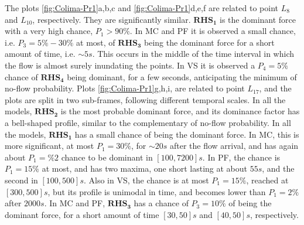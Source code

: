 \documentclass{article}
\begin{document}
The plots \ref{fig:Colima-Pr1}a,b,c and \ref{fig:Colima-Pr1}d,e,f are related to point $L_8$ and $L_{10}$, respectively. They are significantly similar. $\boldsymbol{RHS_1}$ is the dominant force with a very high chance, $P_1>90\%$. In MC and PF it is observed a small chance, i.e. $P_3=5\%-30\%$ at most, of $\boldsymbol{RHS_3}$ being the dominant force for a short amount of time, i.e. $\sim 5 s$. This occurs in the middle of the time interval in which the flow is almost surely inundating the points. In VS it is observed a $P_4=5\%$ chance of $\boldsymbol{RHS_4}$ being dominant, for a few seconds, anticipating the minimum of no-flow probability. Plots \ref{fig:Colima-Pr1}g,h,i, are related to point $L_{17}$, and the plots are split in two sub-frames, following different temporal scales. In all the models, $\boldsymbol{RHS_2}$ is the most probable dominant force, and its dominance factor has a bell-shaped profile, similar to the complementary of no-flow probability. In all the models, $\boldsymbol{RHS_1}$ has a small chance of being the dominant force. In MC, this is more significant, at most $P_1=30\%$, for $\sim 20 s$ after the flow arrival, and has again about $P_1=\%2$ chance to be dominant in $[100, 7200] s$. In PF, the chance is $P_1=15\%$ at most, and has two maxima, one short lasting at about $55 s$, and the second in $[100,500] s$. Also in VS, the chance is at most $P_1=15\%$, reached at $[300, 500] s$, but its profile is unimodal in time, and becomes lower than $P_1=2\%$ after $2000 s$. In MC and PF, $\boldsymbol{RHS_3}$ has a chance of $P_3=10\%$ of being the dominant force, for a short amount of time $[30, 50] s$ and $[40, 50] s$, respectively.
\end{document}
